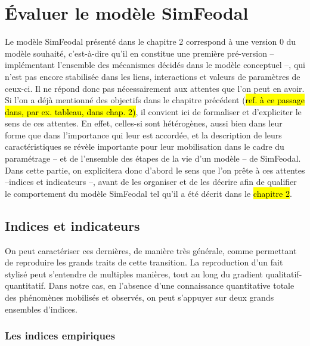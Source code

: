 \clearpage
\section[Évaluer SimFeodal]{Évaluer le modèle SimFeodal}

Le modèle SimFeodal présenté dans le chapitre 2 correspond à une \og version 0\fg{} du modèle souhaité, c'est-à-dire qu'il en constitue une première pré-version -- implémentant l'ensemble des mécanismes décidés dans le modèle conceptuel --, qui n'est pas encore stabilisée dans les liens, interactions et valeurs de paramètres de ceux-ci.
Il ne répond donc pas nécessairement aux attentes que l'on peut en avoir.
Si l'on a déjà mentionné des objectifs dans le chapitre précédent (\hl{ref. à ce passage dans, par ex. tableau, dans chap. 2)}, il convient ici de formaliser et d'expliciter le sens de ces attentes.
En effet, celles-si sont hétérogènes, aussi bien dans leur forme que dans l'importance qui leur est accordée, et la description de leurs caractéristiques se révèle importante pour leur mobilisation dans le cadre du paramétrage -- et de l'ensemble des étapes de la vie d'un modèle -- de SimFeodal.
Dans cette partie, on explicitera donc d'abord le sens que l'on prête à ces attentes --indices et indicateurs --, avant de les organiser et de les décrire afin de qualifier le comportement du modèle SimFeodal tel qu'il a été décrit dans le \hl{chapitre 2}.

\subsection{Indices et indicateurs}

On peut caractériser ces dernières, de manière très générale, comme permettant de reproduire les grands traits de cette transition.
La reproduction d'un fait stylisé peut s'entendre de multiples manières, tout au long du gradient qualitatif-quantitatif.
Dans notre cas, en l'absence d'une connaissance quantitative totale des phénomènes mobilisés et observés, on peut s'appuyer sur deux grands ensembles d'\og indices\fg{}.

\subsubsection{Les indices empiriques}

